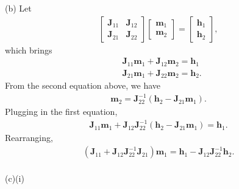 \documentclass{article}
\newcommand{\qeds}{\hfill\qedsymbol}
\newcommand{\bm}{\mathbf}
\begin{document}
\noindent
(b) Let
\begin{align*}
\begin{bmatrix}
    \bm{J}_{11} & \bm{J}_{12} \\
    \bm{J}_{21} & \bm{J}_{22}
\end{bmatrix}
\begin{bmatrix}
    \bm{m}_{1}\\
    \bm{m}_{2}
\end{bmatrix} = 
\begin{bmatrix}
    \bm{h}_{1}\\
    \bm{h}_{2}
\end{bmatrix},
\end{align*}
which brings
\begin{align*}
	&\bm{J}_{11}\bm{m}_1 + \bm{J}_{12}\bm{m}_2 = \bm{h}_1\\
	&\bm{J}_{21}\bm{m}_1 + \bm{J}_{22}\bm{m}_2 = \bm{h}_2.
\end{align*}
%
From the second equation above, we have
\begin{align*}
	\bm{m}_2 = \bm{J}_{22}^{-1}(\bm{h}_2 - \bm{J}_{21}\bm{m}_1).
\end{align*}
%
Plugging in the first equation,
\begin{align*}
	\bm{J}_{11}\bm{m}_1 + \bm{J}_{12}\bm{J}_{22}^{-1}(\bm{h}_2 - \bm{J}_{21}\bm{m}_1) = \bm{h}_1.
\end{align*}
Rearranging,
\begin{align*}
	\left(\bm{J}_{11} + \bm{J}_{12}\bm{J}_{22}^{-1}\bm{J}_{21}\right)\bm{m}_1 = \bm{h}_1 - \bm{J}_{12}\bm{J}_{22}^{-1}\bm{h}_2.
\end{align*}\qeds
\\

\noindent
(c)(i) 
\end{document}
